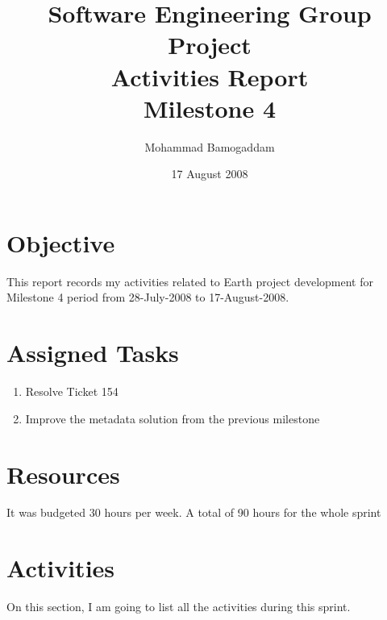 \documentclass[a4paper,12pt]{article}
\title{Software Engineering Group Project \\ Activities Report\\Milestone 4}
\author{Mohammad Bamogaddam}
\date{17 August 2008}
\begin{document}
\maketitle

\section*{Objective}
This report records my activities related to Earth project development for Milestone 4 period from 28-July-2008 to 17-August-2008.
\section*{Assigned Tasks}
\begin{enumerate}
    \item Resolve Ticket 154
    \item Improve the metadata solution from the previous milestone 
\end{enumerate}
\section*{Resources}
It was budgeted 30 hours per week. A total of 90 hours for the whole sprint

\newpage

\section*{Activities}
On this section, I am going to list all the activities during this sprint.
\end{document}
